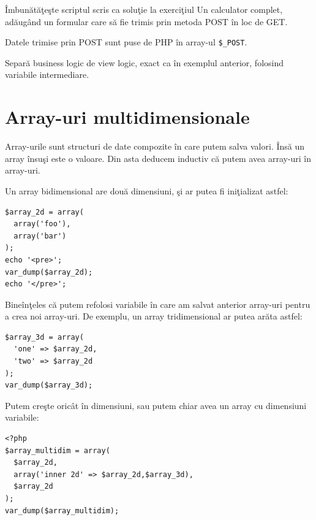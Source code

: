 
\begin{Exercise}[title={View Logic şi Business Logic},difficulty=1]
Îmbunătăţeşte scriptul scris ca soluţie la exerciţiul {\glqq}Un calculator complet{\grqq},
adăugând un formular care să fie trimis prin metoda POST în loc de GET.

Datele trimise prin POST sunt puse de PHP în array-ul \texttt{\$\_POST}.

Separă business logic de view logic, exact ca în exemplul anterior, folosind
variabile intermediare.
\end{Exercise}



\section{Array-uri multidimensionale}
Array-urile sunt structuri de date compozite în care putem salva valori.
Însă un array însuşi este o valoare. Din asta deducem inductiv că
putem avea array-uri în array-uri.

Un array bidimensional are două dimensiuni, şi ar putea fi iniţializat
astfel:
\begin{lstlisting}
$array_2d = array(
  array('foo'),
  array('bar')
);
echo '<pre>';
var_dump($array_2d);
echo '</pre>';
\end{lstlisting}
Bineînţeles că putem refolosi variabile în care am salvat anterior array-uri
pentru a crea noi array-uri. De exemplu, un array tridimensional ar putea arăta
astfel:
\begin{lstlisting}
$array_3d = array(
  'one' => $array_2d,
  'two' => $array_2d
);
var_dump($array_3d);
\end{lstlisting}
Putem creşte oricât în dimensiuni, sau putem chiar avea un array cu dimensiuni variabile:
\begin{lstlisting}
<?php
$array_multidim = array(
  $array_2d,
  array('inner 2d' => $array_2d,$array_3d),
  $array_2d
);
var_dump($array_multidim);
\end{lstlisting}

